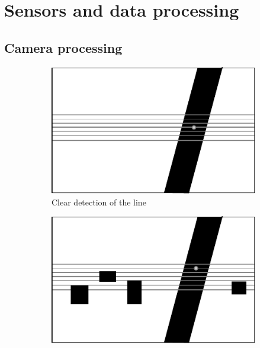 \section{Sensors and data processing} %
\label{sec:mr_sensors_and_data_processing}

	\subsection{Camera processing} %
	\label{sub:mr_camera_processing}
	

	\begin{figure}
        \centering
        \begin{subfigure}[ht!]{0.296\textwidth}
            \includegraphics[width=\textwidth]{figs/mr_camera_processing_1}
            \caption{Clear detection of the line}
            \label{fig:mr_camera_processing_1}
        \end{subfigure}
        \hspace{40pt}
        \begin{subfigure}[ht!]{0.296\textwidth}
            \includegraphics[width=\textwidth]{figs/mr_camera_processing_2}

\end{subfigure}
\end{figure}
